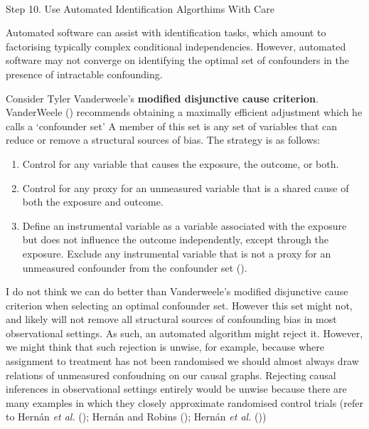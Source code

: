 \documentclass[
  single column]{article}
\makeatletter
\let\oldparagraph\paragraph
\renewcommand{\paragraph}{
    \@ifstar
      \xxxParagraphStar
      \xxxParagraphNoStar
  }
\newcommand{\xxxParagraphStar}[1]{\oldparagraph*{#1}\mbox{}}
\newcommand{\xxxParagraphNoStar}[1]{\oldparagraph{#1}\mbox{}}
\providecommand{\tightlist}{%
  \setlength{\itemsep}{0pt}\setlength{\parskip}{0pt}}\usepackage{longtable,booktabs,array}
\makeatother
\begin{document}
\paragraph{Step 10. Use Automated Identification Algorthims With
Care}\label{step-10.-use-automated-identification-algorthims-with-care}

Automated software can assist with identification tasks, which amount to
factorising typically complex conditional independencies. However,
automated software may not converge on identifying the optimal set of
confounders in the presence of intractable confounding.

Consider Tyler Vanderweele's \textbf{modified disjunctive cause
criterion}. VanderWeele ()
recommends obtaining a maximally efficient adjustment which he calls a
`confounder set' A member of this set is any set of variables that can
reduce or remove a structural sources of bias. The strategy is as
follows:

\begin{enumerate}
\def\labelenumi{\alph{enumi}.}
\tightlist
\item
  Control for any variable that causes the exposure, the outcome, or
  both.
\item
  Control for any proxy for an unmeasured variable that is a shared
  cause of both the exposure and outcome.
\item
  Define an instrumental variable as a variable associated with the
  exposure but does not influence the outcome independently, except
  through the exposure. Exclude any instrumental variable that is not a
  proxy for an unmeasured confounder from the confounder set
  ().
\end{enumerate}

I do not think we can do better than Vanderweele's modified disjunctive
cause criterion when selecting an optimal confounder set. However this
set might not, and likely will not remove all structural sources of
confounding bias in most observational settings. As such, an automated
algorithm might reject it. However, we might think that such rejection
is unwise, for example, because where assignment to treatment has not
been randomised we should almost always draw relations of unmeasured
confoudning on our causal graphs. Rejecting causal inferences in
observational settings entirely would be unwise because there are many
examples in which they closely approximate randomised control trials
(refer to Hernán \emph{et al.} ();
Hernán and Robins (); Hernán
\emph{et al.}
())
\end{document}
